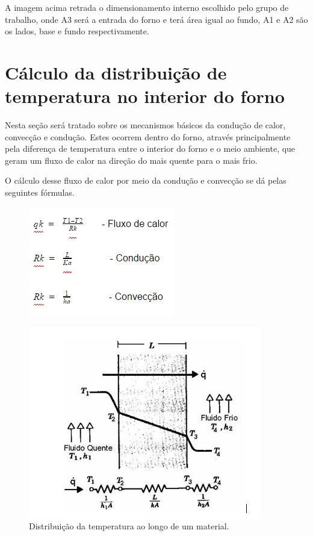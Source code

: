 A imagem acima retrada o dimensionamento interno escolhido pelo grupo de trabalho, onde A3 será a entrada do forno e terá área igual ao fundo, A1 e A2 são os lados, base e fundo respectivamente. 

\section{Cálculo da distribuição de temperatura no interior do forno}

Nesta seção será tratado sobre os mecanismos básicos da condução de calor, convecção e condução. Estes ocorrem dentro do forno, através principalmente pela diferença de temperatura entre o interior do forno e o meio ambiente, que geram um fluxo de calor na direção do mais quente para o mais frio.

O cálculo desse fluxo de calor por meio da condução e convecção se dá pelas seguintes fórmulas.


\begin{figure}[!h]
	\centering
	\label{form1}
	\includegraphics[keepaspectratio=true,scale=1.0]{figuras/form1.JPG}
\end{figure}


\begin{figure}[!h]
	\centering
	\label{dist_temperatura}
	\includegraphics[keepaspectratio=true,scale=1.0]{figuras/dist_temperatura.JPG}
	\caption{Distribuição da temperatura ao longo de um material.}
\end{figure}

